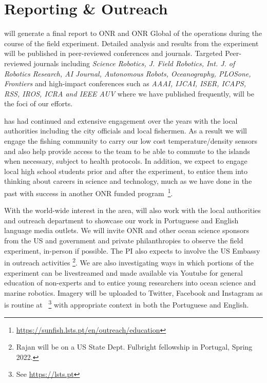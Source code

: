 \section{Reporting \& Outreach}

\proj will generate a final report to ONR and ONR Global of the
operations during the course of the field experiment. Detailed
analysis and results from the experiment will be published in
peer-reviewed conferences and journals. Targeted Peer-reviewed
journals including \emph{Science Robotics, J. Field Robotics,
  Int. J. of Robotics Research, AI Journal, Autonomous Robots,
  Oceanography, PLOSone, Frontiers} and high-impact conferences such
as \emph{AAAI, IJCAI, ISER, ICAPS, RSS, IROS, ICRA and IEEE AUV} where
we have published frequently, will be the foci of our efforts.

\inst has had continued and extensive engagement over the years with the
local authorities including the \naz city officials and local fishermen.
As a result we will engage the fishing community to carry our low cost
temperature/density sensors and also help provide access to the team to
be able to commute to the islands when necessary, subject to health
protocols. In addition, we expect to engage local high school students
prior and after the experiment, to entice them into thinking about
careers in science and technology, much as we have done in the past with
success in another ONR funded
program~\footnote{\url{https://sunfish.lsts.pt/en/outreach/education}}.

With the world-wide interest in the \naz area, \proj will also work
with the local authorities and \univ outreach department to showcase
our work in Portuguese and English language media outlets. We will
invite ONR and other ocean science sponsors from the US and government
and private philanthropies to observe the field experiment, in-person
if possible. The PI also expects to involve the US Embassy in outreach
activities \footnote{Rajan will be on a US State Dept. Fulbright
  fellowship in Portugal, Spring 2022.}. We are also investigating
ways in which portions of the experiment can be livestreamed and made
available via Youtube for general education of non-experts and to
entice young researchers into ocean science and marine
robotics. Imagery will be uploaded to Twitter, Facebook and Instagram
as is routine at \ls ~\footnote{See \url{https://lsts.pt}} with
appropriate context in both the Portuguese and English.


